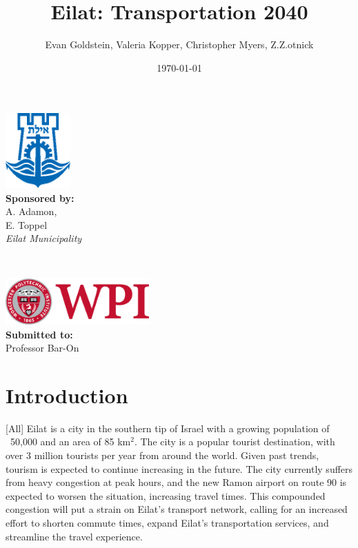 \documentclass[12pt]{article}                       %
\title{Eilat: Transportation 2040}
\author{Evan Goldstein, Valeria Kopper, Christopher Myers, Z.Z.otnick}
\date{\today}
\begin{document}
\maketitle
\vspace{12cm}
\begin{minipage}{0.5\textwidth}
    \begin{flushleft} \large
        \includegraphics[width=2.5cm]{images/eilat_logo.png} \\
        \textbf{Sponsored by:} \\
        A. Adamon, \\
        E. Toppel \\
        \textit{Eilat Municipality}
    \end{flushleft}
\end{minipage}
~
\begin{minipage}{0.4\textwidth}
    \begin{flushright} \large
        \includegraphics[width=5.5cm]{images/WPI_logo.png} \\
        \vspace{0.7cm}
        \textbf{Submitted to:}\\
        Professor Bar-On
        \vspace{1.5cm}
    \end{flushright}
\end{minipage}

\newpage

\renewcommand\abstractname{Summary} %

\tableofcontents
\newpage
\listofauthorships\newpage
\listoffigures
\newpage
{}
\doublespacing

\section{Introduction}[All]
Eilat is a city in the southern tip of Israel with a growing population of ~50,000 and an area of 85 km$^2$. The city is a popular tourist destination, with over 3 million tourists per year from around the world. Given past trends, tourism is expected to continue increasing in the future. The city currently suffers from heavy congestion at peak hours, and the new Ramon airport on route 90 is expected to worsen the situation, increasing travel times. This compounded congestion will put a strain on Eilat's transport network, calling for an increased effort to shorten commute times, expand Eilat's transportation services, and streamline the travel experience. 
\end{document}

